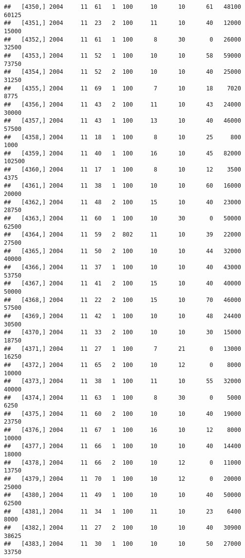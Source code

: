 \documentclass{article}\usepackage[]{graphicx}\usepackage[]{color}
\makeatletter
\newenvironment{kframe}{%
 \def\at@end@of@kframe{}%
 \ifinner\ifhmode%
  \def\at@end@of@kframe{\end{minipage}}%
  \begin{minipage}{\columnwidth}%
 \fi\fi%
 \def\FrameCommand##1{\hskip\@totalleftmargin \hskip-\fboxsep
 \colorbox{shadecolor}{##1}\hskip-\fboxsep
     \hskip-\linewidth \hskip-\@totalleftmargin \hskip\columnwidth}%
 \MakeFramed {\advance\hsize-\width
   \@totalleftmargin\z@ \linewidth\hsize
   \@setminipage}}%
 {\par\unskip\endMakeFramed%
 \at@end@of@kframe}
\newenvironment{knitrout}{}{} %
\makeatother
\begin{document}
\begin{knitrout}
\begin{kframe}
\begin{verbatim}
##   [4350,] 2004     11  61   1  100     10      10      61   48100   60125
##   [4351,] 2004     11  23   2  100     11      10      40   12000   15000
##   [4352,] 2004     11  61   1  100      8      30       0   26000   32500
##   [4353,] 2004     11  52   1  100     10      10      58   59000   73750
##   [4354,] 2004     11  52   2  100     10      10      40   25000   31250
##   [4355,] 2004     11  69   1  100      7      10      18    7020    8775
##   [4356,] 2004     11  43   2  100     11      10      43   24000   30000
##   [4357,] 2004     11  43   1  100     13      10      40   46000   57500
##   [4358,] 2004     11  18   1  100      8      10      25     800    1000
##   [4359,] 2004     11  40   1  100     16      10      45   82000  102500
##   [4360,] 2004     11  17   1  100      8      10      12    3500    4375
##   [4361,] 2004     11  38   1  100     10      10      60   16000   20000
##   [4362,] 2004     11  48   2  100     15      10      40   23000   28750
##   [4363,] 2004     11  60   1  100     10      30       0   50000   62500
##   [4364,] 2004     11  59   2  802     11      10      39   22000   27500
##   [4365,] 2004     11  50   2  100     10      10      44   32000   40000
##   [4366,] 2004     11  37   1  100     10      10      40   43000   53750
##   [4367,] 2004     11  41   2  100     15      10      40   40000   50000
##   [4368,] 2004     11  22   2  100     15      10      70   46000   57500
##   [4369,] 2004     11  42   1  100     10      10      48   24400   30500
##   [4370,] 2004     11  33   2  100     10      10      30   15000   18750
##   [4371,] 2004     11  27   1  100      7      21       0   13000   16250
##   [4372,] 2004     11  65   2  100     10      12       0    8000   10000
##   [4373,] 2004     11  38   1  100     11      10      55   32000   40000
##   [4374,] 2004     11  63   1  100      8      30       0    5000    6250
##   [4375,] 2004     11  60   2  100     10      10      40   19000   23750
##   [4376,] 2004     11  67   1  100     16      10      12    8000   10000
##   [4377,] 2004     11  66   1  100     10      10      40   14400   18000
##   [4378,] 2004     11  66   2  100     10      12       0   11000   13750
##   [4379,] 2004     11  70   1  100     10      12       0   20000   25000
##   [4380,] 2004     11  49   1  100     10      10      40   50000   62500
##   [4381,] 2004     11  34   1  100     11      10      23    6400    8000
##   [4382,] 2004     11  27   2  100     10      10      40   30900   38625
##   [4383,] 2004     11  30   1  100     10      10      50   27000   33750

\end{verbatim}
\end{kframe}
\end{knitrout}
\end{document}
